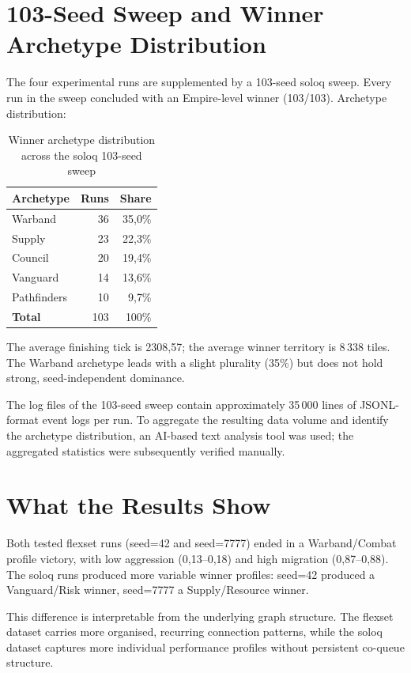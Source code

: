 \section{103-Seed Sweep and Winner Archetype Distribution}

The four experimental runs are supplemented by a 103-seed soloq sweep. Every run in the sweep concluded with an Empire-level winner (103/103). Archetype distribution:

\begin{table}[H]
\centering
\caption{Winner archetype distribution across the soloq 103-seed sweep}
\label{tab:soloq-sweep-archetypes}
\begin{tabular}{|l|r|r|}
\hline
\textbf{Archetype} & \textbf{Runs} & \textbf{Share} \\
\hline
Warband   & 36 & 35{,}0\% \\
Supply    & 23 & 22{,}3\% \\
Council   & 20 & 19{,}4\% \\
Vanguard  & 14 & 13{,}6\% \\
Pathfinders & 10 & 9{,}7\% \\
\hline
\textbf{Total} & 103 & 100\% \\
\hline
\end{tabular}
\end{table}

The average finishing tick is 2308{,}57; the average winner territory is 8\,338 tiles. The Warband archetype leads with a slight plurality (35\%) but does not hold strong, seed-independent dominance.

The log files of the 103-seed sweep contain approximately 35\,000 lines of JSONL-format event logs per run. To aggregate the resulting data volume and identify the archetype distribution, an AI-based text analysis tool was used; the aggregated statistics were subsequently verified manually.

\section{What the Results Show}

Both tested flexset runs (seed=42 and seed=7777) ended in a Warband/Combat profile victory, with low aggression (0{,}13--0{,}18) and high migration (0{,}87--0{,}88). The soloq runs produced more variable winner profiles: seed=42 produced a Vanguard/Risk winner, seed=7777 a Supply/Resource winner.

This difference is interpretable from the underlying graph structure. The flexset dataset carries more organised, recurring connection patterns, while the soloq dataset captures more individual performance profiles without persistent co-queue structure.

